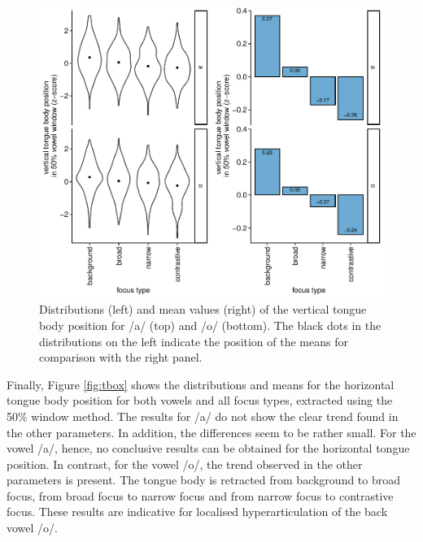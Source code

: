\begin{figure}[htbp]
\begin{center}
\includegraphics[width=\textwidth]{figures/ch7/tboy.pdf}
\caption[Distributions and mean values of the vertical tongue body position.]{Distributions (left) and mean values (right) of the vertical tongue body position for /a/ (top) and /o/ (bottom). The black dots in the distributions on the left indicate the position of the means for comparison with the right panel.}
\label{fig:tboy}
\end{center}
\end{figure}

Finally, Figure \ref{fig:tbox} shows the distributions and means for the horizontal tongue body position for both vowels and all focus types, extracted using the 50\% window method. The results for /a/ do not show the clear trend found in the other parameters. In addition, the differences seem to be rather small. For the vowel /a/, hence, no conclusive results can be obtained for the horizontal tongue position. In contrast, for the vowel /o/, the trend observed in the other parameters is present. The tongue body is retracted from background to broad focus, from broad focus to narrow focus and from narrow focus to contrastive focus. These results are indicative for localised hyperarticulation of the back vowel /o/. 

